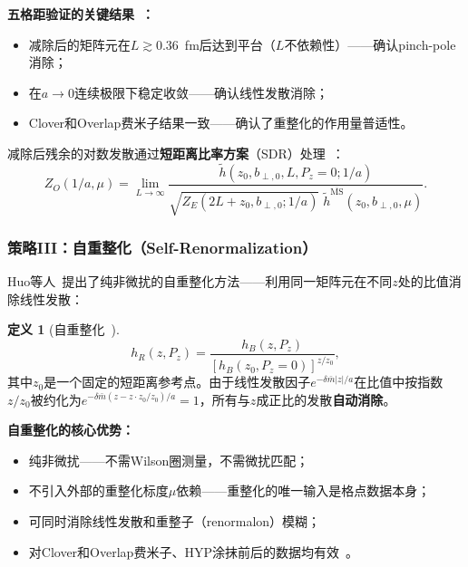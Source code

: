\documentclass[12pt,a4paper]{ctexart}
\theoremstyle{definition}
\newtheorem{definition}{定义}[section]
\begin{document}
\textbf{五格距验证的关键结果~\cite{Zhang2022renormTMD}：}
\begin{itemize}[nosep]
    \item 减除后的矩阵元在$L \gtrsim 0.36$~fm后达到平台（$L$不依赖性）——确认pinch-pole消除；
    \item 在$a \to 0$连续极限下稳定收敛——确认线性发散消除；
    \item Clover和Overlap费米子结果一致——确认了重整化的作用量普适性。
\end{itemize}

减除后残余的对数发散通过\textbf{短距离比率方案}（SDR）处理~\cite{Zhang2022renormTMD}：
\begin{equation}
Z_O(1/a, \mu) = \lim_{L\to\infty} \frac{\tilde{h}(z_0, b_{\perp,0}, L, P_z=0; 1/a)}{\sqrt{Z_E(2L+z_0, b_{\perp,0}; 1/a)} \; \tilde{h}^{\overline{\text{MS}}}(z_0, b_{\perp,0}, \mu)}.
\label{eq:SDR_factor}
\end{equation}

\subsubsection{策略III：自重整化（Self-Renormalization）}

Huo等人~\cite{Huo2021self}提出了纯非微扰的自重整化方法——利用同一矩阵元在不同$z$处的比值消除线性发散：

\begin{definition}[自重整化~\cite{Huo2021self}]
\begin{equation}
\boxed{h_R(z, P_z) = \frac{h_B(z, P_z)}{[h_B(z_0, P_z=0)]^{z/z_0}}},
\label{eq:self_renorm}
\end{equation}
其中$z_0$是一个固定的短距离参考点。由于线性发散因子$e^{-\delta\bar m |z|/a}$在比值中按指数$z/z_0$被约化为$e^{-\delta\bar m (z - z\cdot z_0/z_0)/a} = 1$，所有与$z$成正比的发散\textbf{自动消除}。
\end{definition}

\textbf{自重整化的核心优势：}
\begin{itemize}[nosep]
    \item 纯非微扰——不需Wilson圈测量，不需微扰匹配；
    \item 不引入外部的重整化标度$\mu$依赖——重整化的唯一输入是格点数据本身；
    \item 可同时消除线性发散和重整子（renormalon）模糊；
    \item 对Clover和Overlap费米子、HYP涂抹前后的数据均有效~\cite{Huo2021self}。
\end{itemize}
\end{document}
